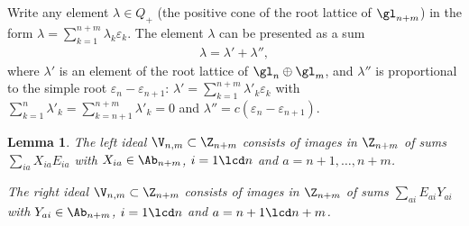 \documentclass[pdftex]{sigma}
\newtheorem{lem}[theorem]{Lemma}
\numberwithin{equation}{section}
\begin{document}
Write any element $\lambda\in Q_+$ (the positive cone of the root lattice of $\gl_{n+m}$) in the form $\lambda=\sum_{k=1}^{n+m}\lambda_k\varepsilon_k$.
The element $\lambda$ can be presented as a sum
\begin{gather}\label{lalaplapp}\lambda= \lambda'+\lambda''  ,\end{gather}
where $\lambda'$ is an element of the root lattice of $\gl_n\oplus \gl_m$, and $\lambda''$ is
proportional to the simple root $\varepsilon_n-\varepsilon_{n+1}$: $\lambda'=\sum_{k=1}^{n+m}\lambda'_k\varepsilon_k$ with
$\sum_{k=1}^n\lambda'_k =  \sum_{k=n+1}^{n+m}\lambda'_k=0$ and $\lambda''=c(\varepsilon_n-\varepsilon_{n+1})$.

\begin{lem}\label{lemma1}%
The left ideal  $\V_{n,m}\subset\Z_{n+m}$ consists of images in $\Z_{n+m}$ of  sums
$\sum_{ia}X_{ia} E_{ia}$ with $X_{ia}\in\Ab_{n+m}$, $i=1\lcd n$ and $a=n+1,\dots, n+m$.


The right ideal   $\V_{n,m}\subset\Z_{n+m}$ consists of images in $\Z_{n+m}$ of  sums $\sum_{ai} E_{ai}Y_{ai}$ with $Y_{ai}\in\Ab_{n+m}$,
$i=1\lcd n $ and  $a=n+1
\lcd n+m$.\end{lem}
\end{document}
